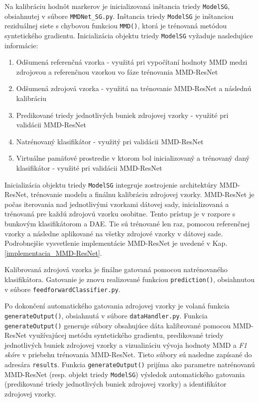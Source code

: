 Na kalibráciu hodnôt markerov je inicializovaná inštancia triedy \texttt{ModelSG}, obsiahnutej v súbore \texttt{MMDNet_SG.py}. Inštancia triedy \texttt{ModelSG} je inštanciou reziduálnej siete s chybovou funkciou \texttt{MMD()}, ktorá je trénovaná metódou syntetického gradientu. Inicializácia objektu triedy \texttt{ModelSG} vyžaduje nasledujúce informácie:
\begin{enumerate}
    \item Odšumená referenčná vzorka - využitá pri vypočítaní hodnoty MMD medzi zdrojovou a referenčnou vzorkou vo fáze trénovania MMD-ResNet
    \item Odšumená zdrojová vzorka - využitá na trénovanie MMD-ResNet a následnú kalibráciu
    \item Predikované triedy jednotlivých buniek zdrojovej vzorky - využité pri validácii MMD-ResNet
    \item Natrénovaný klasifikátor - využitý pri validácii MMD-ResNet
    \item Virtuálne pamäťové prostredie v ktorom bol inicializovaný a trénovaný daný klasifikátor - využité pri validácii MMD-ResNet
\end{enumerate}
Inicializácia objektu triedy \texttt{ModelSG} integruje zostrojenie architektúry MMD-ResNet, trénovanie modelu a finálnu kalibráciu zdrojovej vzorky. MMD-ResNet je počas iterovania nad jednotlivými vzorkami dátovej sady, inicializovaná a trénovaná pre každú zdrojovú vzorku osobitne. Tento prístup je v rozpore s bunkovým klasifikátorom a DAE. Tie sú trénované len raz, pomocou referenčnej vzorky a následne aplikované na všetky zdrojové vzorky v dátovej sade. Podrobnejšie vysvetlenie implementácie MMD-ResNet je uvedené v Kap. \ref{implementacia_MMD-ResNet}.

Kalibrovaná zdrojová vzorka je finálne gatovaná pomocou natrénovaného klasifikátora. Gatovanie je znovu realizované funkciou \texttt{prediction()}, obsiahnutou v súbore \texttt{feedforwardClassifier.py}.

\begin{sloppypar}
Po dokončení automatického gatovania zdrojovej vzorky je volaná funkcia \texttt{generateOutput()}, obsiahnutá v súbore \texttt{dataHandler.py}. Funkcia \texttt{generateOutput()} generuje súbory obsahujúce dáta kalibrované pomocou MMD-ResNet využívajúcej metódu syntetického gradientu, predikované triedy jednotlivých buniek zdrojovej vzorky a vizualizáciu vývoja hodnoty MMD a \textit{F1 skóre} v priebehu trénovania MMD-ResNet. Tieto súbory sú nasledne zapísané do adresára \texttt{results}. Funkcia \texttt{generateOutput()} prijíma ako parametre natrénovanú MMD-ResNet (resp. objekt triedy \texttt{ModelSG}) výsledok automatického gatovania (predikované triedy jednotlivých buniek zdrojovej vzorky) a identifikátor zdrojovej vzorky.
\end{sloppypar}

